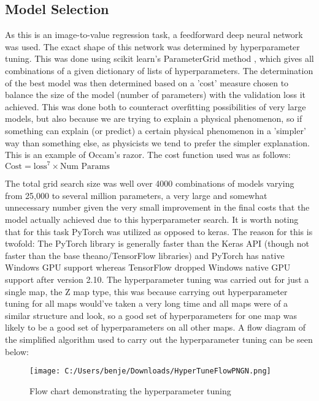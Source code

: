 \documentclass[11pt]{scrartcl}
\begin{document}
\subsection{Model Selection}
As this is an image-to-value regression task, a feedforward deep neural network was used. The exact shape of this network was determined by hyperparameter tuning. This was done using scikit learn's ParameterGrid method \cite{parameterGrid}, which gives all combinations of a given dictionary of lists of hyperparameters. The determination of the best model was then determined based on a 'cost' measure chosen to balance the size of the model (number of parameters) with the validation loss it achieved. This was done both to counteract overfitting possibilities of very large models, but also because we are trying to explain a physical phenomenon, so if something can explain (or predict) a certain physical phenomenon in a 'simpler' way than something else, as physicists we tend to prefer the simpler explanation. This is an example of Occam's razor. The cost function used was as follows:
$\textrm{Cost} = \textrm{loss}^{7} \times \textrm{Num Params}$

The total grid search size was well over 4000 combinations of models varying from 25,000 to several million parameters, a very large and somewhat unnecessary number given the very small improvement in the final costs that the model actually achieved due to this hyperparameter search. It is worth noting that for this task PyTorch was utilized as opposed to keras. The reason for this is twofold: The PyTorch library is generally faster than the Keras API (though not faster than the base theano/TensorFlow libraries) and PyTorch has native Windows GPU support whereas TensorFlow dropped Windows native GPU support after version 2.10. The hyperparameter tuning was carried out for just a single map, the Z map type, this was because carrying out hyperparameter tuning for all maps would've taken a very long time and all maps were of a similar structure and look, so a good set of hyperparameters for one map was likely to be a good set of hyperparameters on all other maps. A flow diagram of the simplified algorithm used to carry out the hyperparameter tuning can be seen below: 

\begin{figure}[H]
\centering
\texttt{[image: C:/Users/benje/Downloads/HyperTuneFlowPNGN.png]}
\caption{Flow chart demonstrating the hyperparameter tuning}
\end{figure}
\end{document}
